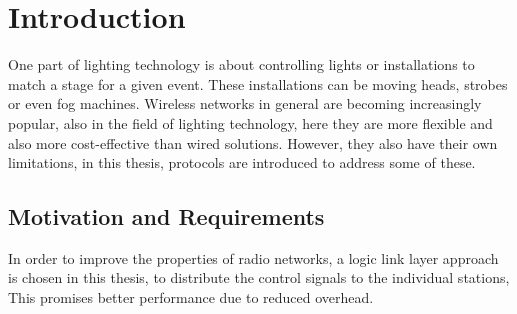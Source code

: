 \chapter{Introduction}


One part of lighting technology is about controlling lights or installations to match a stage for a given event.
These installations can be moving heads, strobes or even fog machines.
Wireless networks in general are becoming increasingly popular, also in the field of lighting technology,
here they are more flexible and also more cost-effective than wired solutions.
However, they also have their own limitations,
in this thesis, protocols are introduced to address some of these.

\section*{Motivation and Requirements}

In order to improve the properties of radio networks, a logic link layer approach is chosen in this thesis,
to distribute the control signals to the individual stations,
This promises better performance due to reduced overhead.

